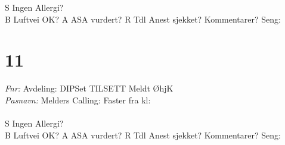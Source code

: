 \documentclass[article]{res}
\begin{document}
\begin{resume}
  S \hfill Ingen Allergi? \makebox[0pt][l]{$\square$}\raisebox{.15ex}{\hspace{0.6em}} \\ \newline 
  B \hfill Luftvei OK? \makebox[0pt][l]{$\square$}\raisebox{.15ex}{\hspace{0.8em}} \newline \newline
  A \hfill ASA vurdert?\makebox[0pt][l]{$\square$}\raisebox{.15ex}{\hspace{0.8em}} \newline \newline
  R \hfill Tdl Anest sjekket? \makebox[0pt][l]{$\square$}\raisebox{.15ex}{\hspace{0.8em}} \newline \newline
  Kommentarer? \hfill Seng: \hspace{.8em}
 \noindent\makebox[\linewidth]{\rule{\paperwidth}{0.4pt}}

\section{11 \hspace{2em} }\vspace{.6em}
  {\sl Fnr:}  \hspace{15em}Avdeling: \hfill DIPSet \makebox[0pt][l]{$\square$}\raisebox{.15ex}{\hspace{1em}}
   TILSETT \makebox[0pt][l]{$\square$}\raisebox{.15ex}{\hspace{0.7em}} Meldt ØhjK \makebox[0pt][l]{$\square$}\raisebox{.15ex}{\hspace{0.1em}}
   \\ \newline
  {\sl Pasnavn:}   \hfill Melders Calling: \hspace{2em} Faster fra kl:\hspace{2em} \\
  \\
  S \hfill Ingen Allergi? \makebox[0pt][l]{$\square$}\raisebox{.15ex}{\hspace{0.8em}} \\ \newline 
  B \hfill Luftvei OK? \makebox[0pt][l]{$\square$}\raisebox{.15ex}{\hspace{0.8em}} \newline \newline
  A \hfill ASA vurdert?\makebox[0pt][l]{$\square$}\raisebox{.15ex}{\hspace{0.8em}} \newline \newline
  R \hfill Tdl Anest sjekket? \makebox[0pt][l]{$\square$}\raisebox{.15ex}{\hspace{0.8em}} \newline \newline
  Kommentarer? \hfill Seng: \hspace{.8em}
\noindent\makebox[\linewidth]{\rule{\paperwidth}{0.2pt}}


\end{resume}
\end{document}
